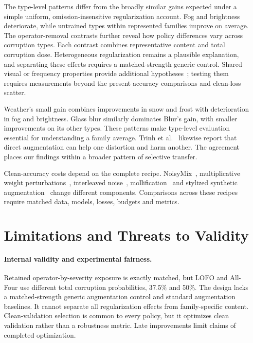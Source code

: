 \documentclass[twoside,a4paper,11pt]{article}
\begin{document}
The type-level patterns differ from the broadly similar gains expected under a simple uniform, omission-insensitive regularization account. Fog and brightness deteriorate, while untrained types within represented families improve on average. The operator-removal contrasts further reveal how policy differences vary across corruption types. Each contrast combines representative content and total corruption dose. Heterogeneous regularization remains a plausible explanation, and separating these effects requires a matched-strength generic control. Shared visual or frequency properties provide additional hypotheses~\cite{mintun2021interaction,vaish2024fourier,wang2025shortcuts}; testing them requires measurements beyond the present accuracy comparisons and clean-loss scatter.

Weather's small gain combines improvements in snow and frost with deterioration in fog and brightness. Glass blur similarly dominates Blur's gain, with smaller improvements on its other types. These patterns make type-level evaluation essential for understanding a family average. Trinh et al.~\cite{trinh2024damp} likewise report that direct augmentation can help one distortion and harm another. The agreement places our findings within a broader pattern of selective transfer.

Clean-accuracy costs depend on the complete recipe. NoisyMix~\cite{erichson2024noisymix}, multiplicative weight perturbations~\cite{trinh2024damp}, interleaved noise~\cite{wiemann2026interleaved}, mollification~\cite{heinonen2025mollification} and stylized synthetic augmentation~\cite{siedel2026stylized} change different components. Comparisons across these recipes require matched data, models, losses, budgets and metrics.

\section{Limitations and Threats to Validity}
\label{sec:limitations}
\paragraph{Internal validity and experimental fairness.}
Retained operator-by-severity exposure is exactly matched, but LOFO and All-Four use different total corruption probabilities, 37.5\% and 50\%. The design lacks a matched-strength generic augmentation control and standard augmentation baselines. It cannot separate all regularization effects from family-specific content. Clean-validation selection is common to every policy, but it optimizes clean validation rather than a robustness metric. Late improvements limit claims of completed optimization.
\end{document}
